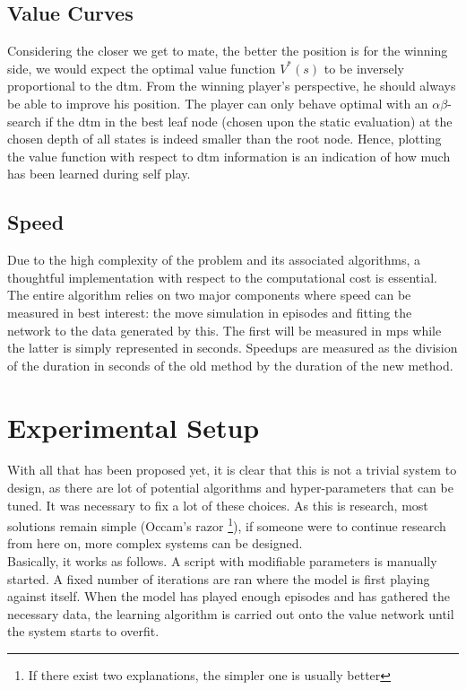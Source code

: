 \subsection{Value Curves}
\label{subsec:vc}
Considering the closer we get to mate, the better the position is for the winning side, we would expect the optimal value function $V^*(s)$ to be inversely proportional to the \gls{dtm}. From the winning player's perspective, he should always be able to improve his position. The player can only behave optimal with an $\alpha\beta$-search if the \gls{dtm} in the best leaf node (chosen upon the static evaluation) at the chosen depth of all states is indeed smaller than the root node. Hence, plotting the value function with respect to \gls{dtm} information is an indication of how much has been learned during self play.

\subsection{Speed}
\label{subsec:speed}
Due to the high complexity of the problem and its associated algorithms, a thoughtful implementation with respect to the computational cost is essential. The entire algorithm relies on two major components where speed can be measured in best interest: the move simulation in episodes and fitting the network to the data generated by this. The first will be measured in \gls{mps} while the latter is simply represented in seconds. Speedups are measured as the division of the duration in seconds of the old method by the duration of the new method.

\section{Experimental Setup}
\label{sec:expsetup}
With all that has been proposed yet, it is clear that this is not a trivial system to design, as there are lot of potential algorithms and hyper-parameters that can be tuned. It was necessary to fix a lot of these choices. As this is research, most solutions remain simple (Occam's razor \footnote{If there exist two explanations, the simpler one is usually better}), if someone were to continue research from here on, more complex systems can be designed.\\

Basically, it works as follows. A script with modifiable parameters is manually started. A fixed number of iterations are ran where the model is first playing against itself. When the model has played enough episodes and has gathered the necessary data, the learning algorithm is carried out onto the value network until the system starts to overfit.


